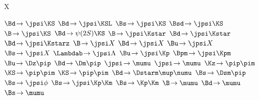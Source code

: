 
\newmathsymbol{\BF}           {\xspace}
\newmathsymbol{\BR}           {\BF}

\renewcommand{\to}            {\ensuremath{\rightarrow}\xspace}
\newcommand{\decay}[2]        {\ensuremath{#1\!\to #2}\xspace}

\newmathsymbol{\Xparticle}      {X\xspace}

\newmathsymbol{\BdToJpsiKS}      {\decay{\Bd}{\jpsi\KS}}
\newmathsymbol{\BdToJpsiKSL}     {\decay{\Bd}{\jpsi\KSL}}
\newmathsymbol{\BsToJpsiKS}      {\decay{\Bs}{\jpsi\KS}}
\newmathsymbol{\BsdToJpsiKS}     {\decay{\Bsd}{\jpsi\KS}}
\newmathsymbol{\BToJpsiKS}       {\decay{\B}{\jpsi\KS}}
\newmathsymbol{\BdToPsiTwoSKS}   {\decay{\Bd}{\psi(2S)\KS}}
\newmathsymbol{\BToJpsiKstar}    {\decay{\B}{\jpsi\Kstar}}
\newmathsymbol{\BdToJpsiKstar}   {\decay{\Bd}{\jpsi\Kstar}}
\newmathsymbol{\BdToJpsiKstarz}  {\decay{\Bd}{\jpsi\Kstarz}}
\newmathsymbol{\BToJpsiX}        {\decay{\B}{\jpsi X}}
\newmathsymbol{\BdToJpsiX}       {\decay{\Bd}{\jpsi X}}
\newmathsymbol{\BuToJpsiX}       {\decay{\Bu}{\jpsi X}}
\newmathsymbol{\BsToJpsiX}       {\decay{\Bs}{\jpsi X}}
\newmathsymbol{\LbToJpsiLambda}  {\decay{\Lambdab}{\jpsi\Lambda}}
\newmathsymbol{\BuToJpsiK}       {\decay{\Bu}{\jpsi\Kp}}
\newmathsymbol{\BuToJpsiKcc}     {\decay{\Bpm}{\jpsi\Kpm}}
\newmathsymbol{\BuToDpi}         {\decay{\Bu}{\Dz\pip}}
\newmathsymbol{\BdToDpi}         {\decay{\Bd}{\Dm\pip}}
\newmathsymbol{\JpsiToMuMu}      {\decay{\jpsi}{\mumu}}
\newmathsymbol{\JpsiTomumu}      {\decay{\jpsi}{\mumu}}
\newmathsymbol{\KzToPiPi}        {\decay{\Kz}{\pip\pim}}
\newmathsymbol{\KSToPiPi}        {\decay{\KS}{\pip\pim}}
\newmathsymbol{\KSTopipi}        {\decay{\KS}{\pip\pim}}
\newmathsymbol{\BdToDstarmunu}   {\decay{\Bd}{\Dstarm\mup\numu}}
\newmathsymbol{\BsToDspi}        {\decay{\Bs}{\Dsm\pip}}
\newmathsymbol{\BsToJpsiphi}     {\decay{\Bs}{\jpsi\phi}}
\newmathsymbol{\BsToJpsiKK}      {\decay{\Bs}{\jpsi\Kp\Km}}
\newmathsymbol{\BsToKK}          {\decay{\Bs}{\Kp\Km}}
\newmathsymbol{\BToMuMu}         {\decay{\B}{\mumu}}
\newmathsymbol{\BdToMuMu}        {\decay{\Bd}{\mumu}}
\newmathsymbol{\BsToMuMu}        {\decay{\Bs}{\mumu}}
\newmathsymbol{\inclJPsi}        {\ \jpsi}

